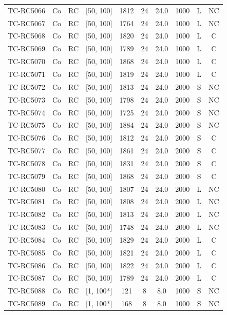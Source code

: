 \begin{longtable}{lccccccccc}
TC-RC5066 & Co & RC & [50, 100] & 1812 & 24 & 24.0 & 1000 & L & NC \\
TC-RC5067 & Co & RC & [50, 100] & 1764 & 24 & 24.0 & 1000 & L & NC \\
TC-RC5068 & Co & RC & [50, 100] & 1820 & 24 & 24.0 & 1000 & L & C \\
TC-RC5069 & Co & RC & [50, 100] & 1789 & 24 & 24.0 & 1000 & L & C \\
TC-RC5070 & Co & RC & [50, 100] & 1868 & 24 & 24.0 & 1000 & L & C \\
TC-RC5071 & Co & RC & [50, 100] & 1819 & 24 & 24.0 & 1000 & L & C \\
TC-RC5072 & Co & RC & [50, 100] & 1813 & 24 & 24.0 & 2000 & S & NC \\
TC-RC5073 & Co & RC & [50, 100] & 1798 & 24 & 24.0 & 2000 & S & NC \\
TC-RC5074 & Co & RC & [50, 100] & 1725 & 24 & 24.0 & 2000 & S & NC \\
TC-RC5075 & Co & RC & [50, 100] & 1884 & 24 & 24.0 & 2000 & S & NC \\
TC-RC5076 & Co & RC & [50, 100] & 1812 & 24 & 24.0 & 2000 & S & C \\
TC-RC5077 & Co & RC & [50, 100] & 1861 & 24 & 24.0 & 2000 & S & C \\
TC-RC5078 & Co & RC & [50, 100] & 1831 & 24 & 24.0 & 2000 & S & C \\
TC-RC5079 & Co & RC & [50, 100] & 1868 & 24 & 24.0 & 2000 & S & C \\
TC-RC5080 & Co & RC & [50, 100] & 1807 & 24 & 24.0 & 2000 & L & NC \\
TC-RC5081 & Co & RC & [50, 100] & 1808 & 24 & 24.0 & 2000 & L & NC \\
TC-RC5082 & Co & RC & [50, 100] & 1813 & 24 & 24.0 & 2000 & L & NC \\
TC-RC5083 & Co & RC & [50, 100] & 1748 & 24 & 24.0 & 2000 & L & NC \\
TC-RC5084 & Co & RC & [50, 100] & 1829 & 24 & 24.0 & 2000 & L & C \\
TC-RC5085 & Co & RC & [50, 100] & 1821 & 24 & 24.0 & 2000 & L & C \\
TC-RC5086 & Co & RC & [50, 100] & 1822 & 24 & 24.0 & 2000 & L & C \\
TC-RC5087 & Co & RC & [50, 100] & 1789 & 24 & 24.0 & 2000 & L & C \\
TC-RC5088 & Co & RC & [1, 100*] & 121 & 8 & 8.0 & 1000 & S & NC \\
TC-RC5089 & Co & RC & [1, 100*] & 168 & 8 & 8.0 & 1000 & S & NC \\

\end{longtable}
